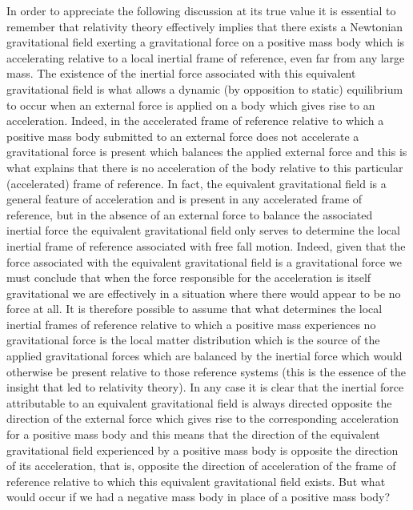 \documentclass[notitlepage,12pt]{report}
\begin{document}
In order to appreciate the following discussion at its true value it is essential to remember that relativity theory effectively implies that there exists a Newtonian gravitational field exerting a gravitational force on a positive mass body which is accelerating relative to a local inertial frame of reference, even far from any large mass. The existence of the inertial force associated with this equivalent gravitational field is what allows a dynamic (by opposition to static) equilibrium to occur when an external force is applied on a body which gives rise to an acceleration. Indeed, in the accelerated frame of reference relative to which a positive mass body submitted to an external force does not accelerate a gravitational force is present which balances the applied external force and this is what explains that there is no acceleration of the body relative to this particular (accelerated) frame of reference. In fact, the equivalent gravitational field is a general feature of acceleration and is present in any accelerated frame of reference, but in the absence of an external force to balance the associated inertial force the equivalent gravitational field only serves to determine the local inertial frame of reference associated with free fall motion. Indeed, given that the force associated with the equivalent gravitational field is a gravitational force we must conclude that when the force responsible for the acceleration is itself gravitational we are effectively in a situation where there would appear to be no force at all. It is therefore possible to assume that what determines the local inertial frames of reference relative to which a positive mass experiences no gravitational force is the local matter distribution which is the source of the applied gravitational forces which are balanced by the inertial force which would otherwise be present relative to those reference systems (this is the essence of the insight that led to relativity theory). In any case it is clear that the inertial force attributable to an equivalent gravitational field is always directed opposite the direction of the external force which gives rise to the corresponding acceleration for a positive mass body and this means that the direction of the equivalent gravitational field experienced by a positive mass body is opposite the direction of its acceleration, that is, opposite the direction of acceleration of the frame of reference relative to which this equivalent gravitational field exists. But what would occur if we had a negative mass body in place of a positive mass body?
\end{document}
